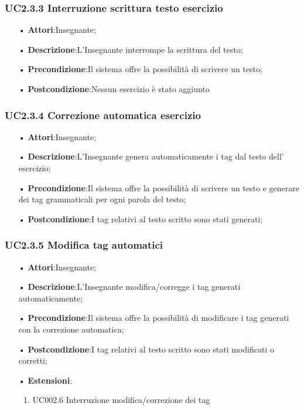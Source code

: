 \subsubsection{UC2.3.3 Interruzione scrittura testo esercizio}
\begin{itemize}
	\item[•] \textbf{Attori}:Insegnante;
	\item[•] \textbf{Descrizione}:L’Insegnante interrompe la scrittura del testo;
	\item[•] \textbf{Precondizione}:Il sistema offre la possibilità di scrivere un testo;
	\item[•] \textbf{Postcondizione}:Nessun esercizio è stato aggiunto
\end{itemize}

\subsubsection{UC2.3.4	Correzione automatica esercizio}
\begin{itemize}
	\item[•] \textbf{Attori}:Insegnante;
	\item[•] \textbf{Descrizione}:L’Insegnante genera automaticamente i tag dal testo dell’ esercizio;
	\item[•] \textbf{Precondizione}:Il sistema offre la possibilità di scrivere un testo e generare dei tag grammaticali per ogni parola del testo;
	\item[•] \textbf{Postcondizione}:I tag relativi al testo scritto sono stati generati;
\end{itemize}

\subsubsection{UC2.3.5	Modifica tag automatici}
\begin{itemize}
	\item[•] \textbf{Attori}:Insegnante;
	\item[•] \textbf{Descrizione}:L’Insegnante modifica/corregge i tag generati automaticamente;
	\item[•] \textbf{Precondizione}:Il sistema offre la possibilità di modificare i tag generati con la correzione automatica;
	\item[•] \textbf{Postcondizione}:I tag relativi al testo scritto sono stati modificati o corretti;
	\item[•] \textbf{Estensioni}:
	\begin{enumerate}
		\item UC002.6 Interruzione modifica/correzione dei tag
	
	\end{enumerate}
\end{itemize}

